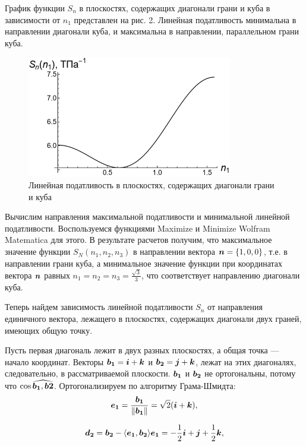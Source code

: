 \documentclass[12pt, a4paper]{article}
\renewcommand{\vec}[1]{\text{\mathversion{bold}${#1}$}}%
\begin{document}
График функции $S_n$ в плоскостях, содержащих диагонали грани и куба в зависимости от $n_1$ представлен на рис. 2. Линейная податливость минимальна в направлении диагонали куба, и
максимальна в направлении, параллельном грани куба.
\begin{figure}[!htbp]
	\centering
	\includegraphics[width=0.8\textwidth]{pic-2}%
	\caption{Линейная податливость в плоскостях, содержащих диагонали грани и куба}
	\vspace*{-2mm}
	\label{lin-grani-kuba}
\end{figure}

Вычислим направления максимальной податливости и минимальной линейной податливости. Воспользуемся функциями Maximize и Minimize Wolfram Matematica для этого. В результате расчетов получим, что максимальное значение функции $S_N(n_1, n_2, n_3)$ в направлении вектора $\vec{n} = \{1, 0, 0\}$, т.е. в направлении грани куба, а минимальное значение функции при координатах вектора $\vec{n}$ равных $n_1 = n_2 = n_3 = \frac{\sqrt{3}}{3}$, что соответствует направлению диагонали куба.

Теперь найдем зависимость линейной податливости $S_n$ от направления единичного вектора, лежащего в плоскостях, содержащих диагонали двух граней, имеющих общую точку.

Пусть первая диагональ лежит в двух разных плоскостях, а общая точка
--- начало координат. Векторы $\vec{b_1} = \vec{i} + \vec{k}$ и $\vec{b_2} = \vec{j} + \vec{k}$, лежат на этих диагоналях,
следовательно, в рассматриваемой плоскости. $\vec{b_1}$ и $\vec{b_2}$ не ортогональны, потому
что $\cos{\widehat{\vec{b_1}, \vec{b2}}}$. Ортогонализируем по алгоритму Грама-Шмидта:
\begin{gather*}
	\vec{e_{1}}=\frac{\vec{b_{1}}}{\|\vec{b_{1}}\|}=\sqrt{2}(\vec{i}+\vec{k}),
\end{gather*}

\begin{gather*}
	\vec{d_{2}}=\vec{b_{2}}-\langle \vec{e_{1}}, \vec{b_{2}} \rangle \vec{e_{1}}=-\frac{1}{2}\vec{i}+\vec{j}+\frac{1}{2}\vec{k},
\end{gather*}
\end{document}
